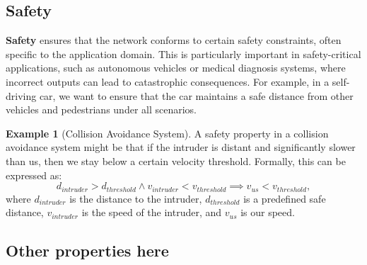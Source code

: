 \documentclass[oneside,11pt,dvipsnames]{book}
\numberwithin{equation}{section}
\theoremstyle{definition}
\newtheorem{example}{Example}[section]
\theoremstyle{remark}
\newcommand{\tvn}[1]{\iftoggle{usecomment}{{\color{red}{[TVN]: #1}}}{}}
\begin{document}


\subsection{Safety}


\textbf{Safety} ensures that the network conforms to certain safety constraints, often specific to the application domain. This is particularly important in safety-critical applications, such as autonomous vehicles or medical diagnosis systems, where incorrect outputs can lead to catastrophic consequences. For example, in a self-driving car, we want to ensure that the car maintains a safe distance from other vehicles and pedestrians under all scenarios.

\begin{example}[Collision Avoidance System]
    A safety property in a collision avoidance system might be that if the intruder is distant and significantly slower than us, then we stay below a certain velocity threshold. Formally, this can be expressed as:
\[
d_{intruder} > d_{threshold} \land v_{intruder} < v_{threshold} \implies v_{us} < v_{threshold},
\]
where $d_{intruder}$ is the distance to the intruder, $d_{threshold}$ is a predefined safe distance, $v_{intruder}$ is the speed of the intruder, and $v_{us}$ is our speed.
\end{example}

\subsection{Other properties here} %


\end{document}
